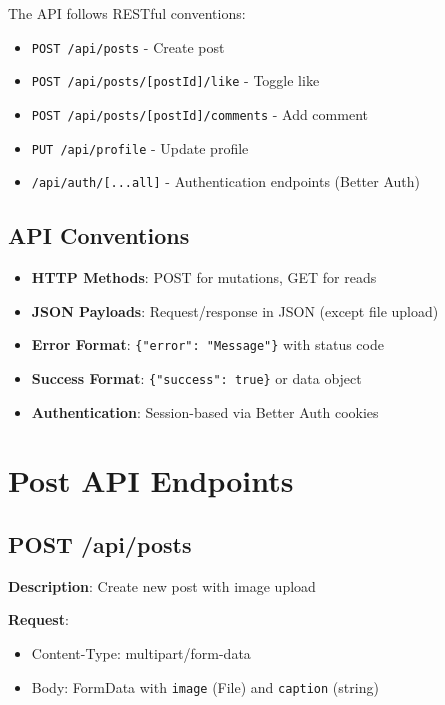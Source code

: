 \documentclass[12pt,a4paper]{report}
\begin{document}
The API follows RESTful conventions:

\begin{itemize}
    \item \texttt{POST /api/posts} - Create post
    \item \texttt{POST /api/posts/[postId]/like} - Toggle like
    \item \texttt{POST /api/posts/[postId]/comments} - Add comment
    \item \texttt{PUT /api/profile} - Update profile
    \item \texttt{/api/auth/[...all]} - Authentication endpoints (Better Auth)
\end{itemize}

\subsection{API Conventions}

\begin{itemize}
    \item \textbf{HTTP Methods}: POST for mutations, GET for reads
    \item \textbf{JSON Payloads}: Request/response in JSON (except file upload)
    \item \textbf{Error Format}: \texttt{\{"error": "Message"\}} with status code
    \item \textbf{Success Format}: \texttt{\{"success": true\}} or data object
    \item \textbf{Authentication}: Session-based via Better Auth cookies
\end{itemize}

\section{Post API Endpoints}

\subsection{POST /api/posts}

\textbf{Description}: Create new post with image upload

\textbf{Request}:
\begin{itemize}
    \item Content-Type: multipart/form-data
    \item Body: FormData with \texttt{image} (File) and \texttt{caption} (string)
\end{itemize}
\end{document}
